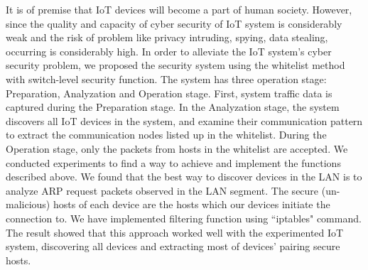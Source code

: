It is of premise that IoT devices will become a part of human society. However, since the quality and capacity of cyber security of IoT system is considerably weak and the risk of problem like privacy intruding, spying, data stealing, occurring is considerably high. In order to alleviate the IoT system’s cyber security problem, we proposed the security system using the whitelist method with switch-level security function. The system has three operation stage: Preparation, Analyzation and Operation stage. First, system traffic data is captured during the Preparation stage. In the Analyzation stage, the system discovers all IoT devices in the system, and examine their communication pattern to extract the communication nodes listed up in the whitelist. During the Operation stage, only the packets from hosts in the whitelist are accepted. We conducted experiments to find a way to achieve and implement the functions described above. We found that the best way to discover devices in the LAN is to analyze ARP request packets observed in the LAN segment. The secure (un-malicious) hosts of each device are the hosts which our devices initiate the connection to. We have implemented filtering function using “iptables" command. The result showed that this approach worked well with the experimented IoT system, discovering all devices and extracting most of devices’ pairing secure hosts. 